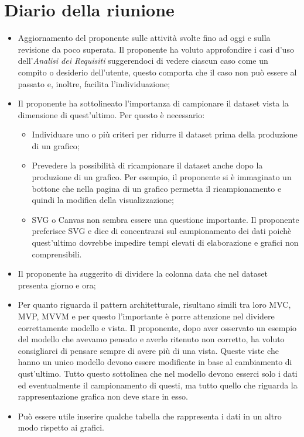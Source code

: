 \section{Diario della riunione}
\begin{itemize}
  \item Aggiornamento del proponente sulle attività svolte fino ad oggi e sulla revisione da poco superata. Il proponente ha voluto approfondire i casi d'uso dell'\textit{Analisi dei Requisiti}
    suggerendoci di vedere ciascun caso come un compito o desiderio dell'utente, questo comporta che il caso non può essere al passato e, inoltre, facilita l'individuazione;
  \item Il proponente ha sottolineato l'importanza di campionare il dataset vista la dimensione di quest'ultimo. Per questo è necessario:
    \begin{itemize}
      \item Individuare uno o più criteri per ridurre il dataset prima della produzione di un grafico;
      \item Prevedere la possibilità di ricampionare il dataset anche dopo la produzione di un grafico. Per esempio, il proponente si è immaginato un bottone che nella pagina di un grafico permetta il ricampionamento e quindi la modifica della visualizzazione;
      \item SVG o Canvas non sembra essere una questione importante. Il proponente preferisce SVG e dice di concentrarsi sul campionamento dei dati poichè quest'ultimo dovrebbe impedire tempi elevati di elaborazione e grafici non comprensibili.
    \end{itemize}
  \item Il proponente ha suggerito di dividere la colonna data che nel dataset presenta giorno e ora;
  \item Per quanto riguarda il pattern architetturale, risultano simili tra loro MVC, MVP, MVVM e per questo l'importante è porre attenzione nel dividere correttamente modello e vista. 
    Il proponente, dopo aver osservato un esempio del modello che avevamo pensato e averlo ritenuto non corretto, ha voluto consigliarci di pensare sempre di avere più di una vista. Queste viste che hanno un unico modello devono essere modificate in base al cambiamento di qust'ultimo.
    Tutto questo sottolinea che nel modello devono esserci solo i dati ed eventualmente il campionamento di questi, ma tutto quello che riguarda la rappresentazione grafica non deve stare in esso.
  \item Può essere utile inserire qualche tabella che rappresenta i dati in un altro modo rispetto ai grafici.
\end{itemize}
